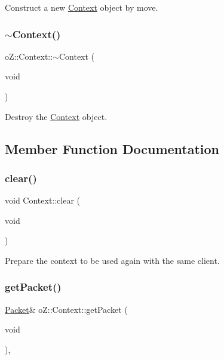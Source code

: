 Construct a new \mbox{\hyperlink{classo_z_1_1_context}{Context}} object by move. 

\mbox{\label{classo_z_1_1_context_afe2e01a552a7711772e4028f778703e8}} 
\subsubsection{\texorpdfstring{$\sim$Context()}{~Context()}}
{\footnotesize\ttfamily o\+Z\+::\+Context\+::$\sim$\+Context (\begin{DoxyParamCaption}\item[{void}]{ }\end{DoxyParamCaption})\hspace{0.3cm}{\ttfamily [default]}}



Destroy the \mbox{\hyperlink{classo_z_1_1_context}{Context}} object. 



\subsection{Member Function Documentation}
\mbox{\label{classo_z_1_1_context_ade0f49a6468ea81eec1e97ace81b926e}} 
\subsubsection{\texorpdfstring{clear()}{clear()}}
{\footnotesize\ttfamily void Context\+::clear (\begin{DoxyParamCaption}\item[{void}]{ }\end{DoxyParamCaption})}



Prepare the context to be used again with the same client. 

\mbox{\label{classo_z_1_1_context_ad2814c8e2b850cb4c5a70a964dbd3d58}} 
\subsubsection{\texorpdfstring{getPacket()}{getPacket()}\hspace{0.1cm}{\footnotesize\ttfamily [1/2]}}
{\footnotesize\ttfamily \mbox{\hyperlink{classo_z_1_1_packet}{Packet}}\& o\+Z\+::\+Context\+::get\+Packet (\begin{DoxyParamCaption}\item[{void}]{ }\end{DoxyParamCaption})\hspace{0.3cm}{\ttfamily [inline]}, {\ttfamily [noexcept]}}



